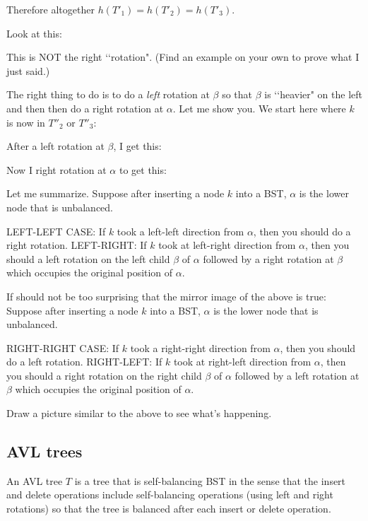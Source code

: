 Therefore altogether $h(T'_1) = h(T'_2) = h(T'_3)$.

Look at this:

This is NOT the right \lq\lq rotation".
(Find an example on your own to prove what I just said.)

The right thing to do is to do a \textit{left} rotation
at $\beta$ so that $\beta$ is \lq\lq heavier"
on the left and then then do a right rotation at $\alpha$.
Let me show you.
We start here where $k$ is now in $T''_2$ or $T''_3$:

After a left rotation at $\beta$, I get this:

Now I right rotation at $\alpha$ to get this:


Let me summarize.
Suppose after inserting a node $k$ into a BST,
$\alpha$ is the lower node that is unbalanced.
\begin{tightlist}
\li LEFT-LEFT CASE: If $k$ took a left-left direction from $\alpha$,
then you should do a right rotation.
\li LEFT-RIGHT: If $k$ took at left-right direction from $\alpha$,
then you should a left rotation on the left child $\beta$ of $\alpha$
followed by a right rotation at $\beta$ which occupies the original 
position of $\alpha$.
\end{tightlist}

If should not be too surprising that the mirror image of
the above is true:
Suppose after inserting a node $k$ into a BST,
$\alpha$ is the lower node that is unbalanced.
\begin{tightlist}
\li RIGHT-RIGHT CASE: If $k$ took a right-right direction from $\alpha$,
then you should do a left rotation.
\li RIGHT-LEFT: If $k$ took at right-left direction from $\alpha$,
then you should a right rotation on the right child $\beta$ of $\alpha$
followed by a left rotation at $\beta$ which occupies the original 
position of $\alpha$.
\end{tightlist}
Draw a picture similar to the above to see what's happening.

\newpage
\subsection{AVL trees}

An AVL tree $T$ is a tree that is self-balancing BST in the sense that
the insert and delete operations include self-balancing operations
(using left and right rotations) so that the tree is balanced after each
insert or delete operation.

\newpage

